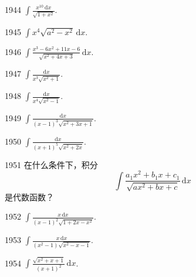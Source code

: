 \begin{prob}[S]{1944}
$\displaystyle \int \frac{x^{10}\,\mathrm{d}x}{\sqrt{1 + x^2}}$.
\end{prob}

\begin{prob}[S]{1945}
$\displaystyle \int x^4\sqrt{a^2 - x^2}\,\mathrm{d}x$.
\end{prob}

\begin{prob}[S]{1946}
$\displaystyle \int \frac{x^3 - 6x^2 + 11x - 6}{\sqrt{x^2 + 4x + 3}}\,\mathrm{d}x$.
\end{prob}

\begin{prob}[S]{1947}
$\displaystyle \int \frac{\mathrm{d}x}{x^3\sqrt{x^2 + 1}}$.
\end{prob}

\begin{prob}[S]{1948}
$\displaystyle \int \frac{\mathrm{d}x}{x^4\sqrt{x^2 - 1}}$.
\end{prob}

\begin{prob}[S]{1949}
$\displaystyle \int \frac{\mathrm{d}x}{(x - 1)^3\sqrt{x^2 + 3x + 1}}$.
\end{prob}

\begin{prob}[S]{1950}
$\displaystyle \int \frac{\mathrm{d}x}{(x + 1)^5\sqrt{x^2 + 2x}}$.
\end{prob}

\begin{prob}[M]{1951}
在什么条件下，积分
\[
\int \frac{a_1 x^2 + b_1 x + c_1}{\sqrt{ax^2 + bx + c}}\,\mathrm{d}x
\]
是代数函数？
\end{prob}


\begin{prob}[S]{1952}
$\displaystyle \int \frac{x\,\mathrm{d}x}{(x - 1)^2\sqrt{1 + 2x - x^2}}$.
\end{prob}

\begin{prob}[S]{1953}
$\displaystyle \int \frac{x\,\mathrm{d}x}{(x^2 - 1)\sqrt{x^2 - x - 1}}$.
\end{prob}

\begin{prob}[S]{1954}
$\displaystyle \int \frac{\sqrt{x^2 + x + 1}}{(x + 1)^2}\,\mathrm{d}x$.
\end{prob}

